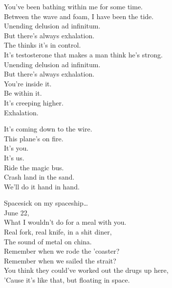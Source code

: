 
You've been bathing within me for some time. \\
Between the wave and foam, I have been the tide. \\
Unending delusion ad infinitum. \\
But there's always exhalation. \\
The  thinks it's in control. \\
It's testosterone that makes a man think he's strong. \\
Unending delusion ad infinitum. \\
But there's always exhalation. \\

You're inside it. \\
Be within it. \\
It's creeping higher. \\
Exhalation. \\


It's coming down to the wire. \\
This plane's on fire. \\
It's you. \\
It's us. \\
Ride the magic bus. \\
Crash land in the sand. \\
We'll do it hand in hand. \\





Spacesick on my spaceship… \\

June 22, \\
What I wouldn't do for a meal with you. \\
Real fork, real knife, in a shit diner, \\
The sound of metal on china. \\
Remember when we rode the 'coaster? \\
Remember when we sailed the strait? \\
You think they could've worked out the drugs up here, \\
'Cause it's like that, but floating in space. \\

